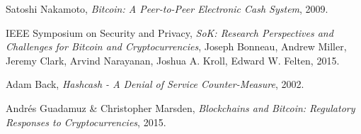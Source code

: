 %
%
%
\begin{thebibliography}{1}

  Satoshi Nakamoto,
  \emph{Bitcoin: A Peer-to-Peer Electronic Cash System},
  2009.



  IEEE Symposium on Security and Privacy,
  \emph{SoK: Research Perspectives and Challenges for Bitcoin and
Cryptocurrencies},
  Joseph Bonneau, Andrew Miller, Jeremy Clark, Arvind Narayanan, Joshua
A. Kroll, Edward W. Felten,
  2015.



  Adam Back,
  \emph{Hashcash - A Denial of Service Counter-Measure},
  2002.

  Andrés Guadamuz \& Christopher Marsden,
  \emph{Blockchains and Bitcoin: Regulatory Responses to Cryptocurrencies},
  2015.


\end{thebibliography}
